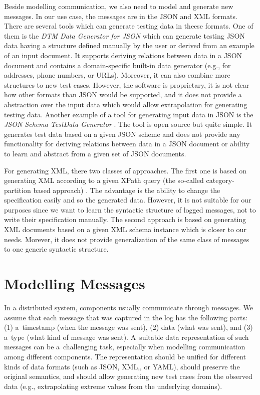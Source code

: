 {Beside modelling communication, we also need to model and generate new messages.
In our use case, the messages are in the JSON and XML formats.
There are several tools which can generate testing data in theese formats.
One of them is the \emph{DTM Data Generator for JSON} \cite{ref_dtm} which can
generate testing JSON data having a structure defined manually by the user
or derived from an example of an input document.
It supports deriving relations between data in a JSON document and contains a domain-specific
built-in data generator (e.g., for addresses, phone numbers, or URLs).
Moreover, it can also combine more structures to new test cases.
However, the software is proprietary, it is not clear how other
formats than JSON would be supported, and it does not provide
a abstraction over the input data which would allow
extrapolation for generating testing data.
Another example of a tool for generating input data in JSON is the \emph{JSON Schema TestData Generator} \cite{ref_stg}.
The tool is open source but quite simple.
It generates test data based on a given JSON scheme and does not provide
any functionality for deriving relations between data in a JSON document
or ability to learn and abstract from a given set of JSON documents.

For generating XML, there two classes of approaches.
The first one is based on generating XML according to a given XPath query
(the so-called category-partition based approach) \cite{xpath1, xpath2}.
The advantage is the ability to change the specification easily and so the generated data.
However, it is not suitable for our purposes since we want to learn the syntactic structure
of logged messages, not to write their specification manually.
The second approach is based on generating XML documents based on a given XML schema instance \cite{xmlscheme}
which is closer to our needs.
Morever, it does not provide generalization of the same class of messages to one generic syntactic structure. 

\section{Modelling Messages} \label{sec:messages} 

In a distributed system, components usually communicate through messages.
%
We assume that each message that was captured in the log has the following
parts: (1) a~timestamp (when the message was sent), (2) data (what was sent),
and (3) a~type (what kind of message was sent).
%
A~suitable data representation of such messages can be a~challenging task,
especially when modelling communication among different components.  
%
The representation should be unified for different kinds of data formats (such
as JSON, XML,, or YAML), should preserve the original semantics, and should allow
generating new test cases from the observed data (e.g., extrapolating extreme
values from the underlying domains).  

}
